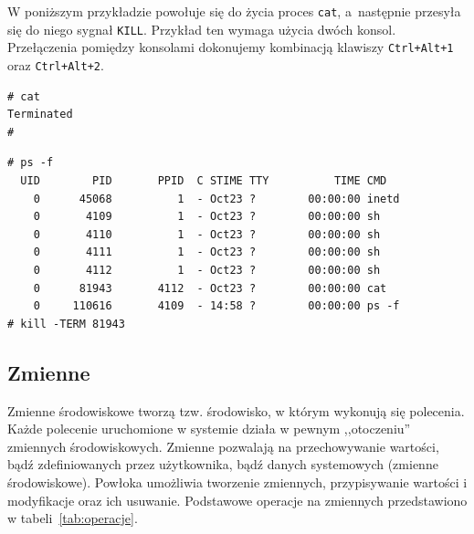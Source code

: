 \begin{example}
 
W poniższym przykładzie powołuje się do życia proces \lstinline[style=MyBashStyle]{cat}, a~następnie przesyła się do niego sygnał \lstinline[style=MyBashStyle]{KILL}. Przykład ten wymaga użycia dwóch konsol. Przełączenia pomiędzy konsolami dokonujemy kombinacją klawiszy \lstinline[style=MyBashStyle]{Ctrl+Alt+1} oraz \lstinline[style=MyBashStyle]{Ctrl+Alt+2}.
 
\begin{lstlisting}[style=MyBashStyle,caption=Konsola 1] 
# cat
Terminated
# 
\end{lstlisting} 

\begin{lstlisting}[style=MyBashStyle,caption=Konsola 2,deletekeywords={cat,ps}] 
# ps -f 
  UID        PID       PPID  C STIME TTY          TIME CMD
    0      45068          1  - Oct23 ?        00:00:00 inetd
    0       4109          1  - Oct23 ?        00:00:00 sh
    0       4110          1  - Oct23 ?        00:00:00 sh
    0       4111          1  - Oct23 ?        00:00:00 sh
    0       4112          1  - Oct23 ?        00:00:00 sh
    0      81943       4112  - Oct23 ?        00:00:00 cat
    0     110616       4109  - 14:58 ?        00:00:00 ps -f
# kill -TERM 81943
\end{lstlisting}

\end{example} 



\subsection{Zmienne}

Zmienne środowiskowe tworzą tzw. środowisko, w którym wykonują się polecenia. Każde polecenie uruchomione w systemie działa w pewnym ,,otoczeniu'' zmiennych środowiskowych. Zmienne pozwalają na przechowywanie wartości, bądź zdefiniowanych przez użytkownika, bądź danych systemowych (zmienne środowiskowe). Powłoka umożliwia tworzenie zmiennych, przypisywanie wartości i modyfikacje oraz ich usuwanie. Podstawowe operacje na zmiennych przedstawiono w tabeli~\ref{tab:operacje}. 

